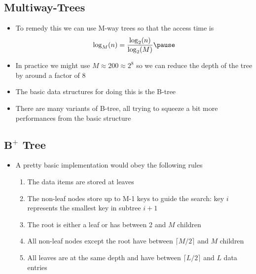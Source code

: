
\begin{slide}
\section{Multiway-Trees}

\begin{PauseHighLight}
  \begin{itemize}
  \item To remedy this we can use M-way trees so that the access time is
    \begin{align*}
      \log_M(n) = \frac{\log_2(n)}{\log_2(M)}\pause
    \end{align*}
  \item In practice we might use $M\approx 200 \approx 2^8$ so we can
    reduce the depth of the tree by around a factor of 8\pause
  \item The basic data structures for doing this is the B-tree\pause
  \item There are many variants of B-tree, all trying to squeeze a bit
    more performances from the basic structure\pause
  \end{itemize}
\end{PauseHighLight}

\end{slide}


\begin{slide}
\section{$\mathbf{B}^{+}$ Tree}

\begin{PauseHighLight}
  \begin{itemize}
  \item A pretty basic implementation would obey the following rules
    \begin{enumerate}\squeeze
    \item The data items are stored at leaves\pause
    \item The non-leaf nodes store up to M-1 keys to guide the
      search: key $i$ represents the smallest key in subtree
      $i+1$\pause
    \item The root is either a leaf or has between 2 and $M$ children\pause
    \item All non-leaf nodes except the root have between $\lceil M/2
      \rceil$ and $M$ children\pause
    \item All leaves are at the same depth and have between $\lceil L/2
      \rceil$ and $L$ data entries\pause
    \end{enumerate}
  \end{itemize}
\end{PauseHighLight}

\end{slide}

